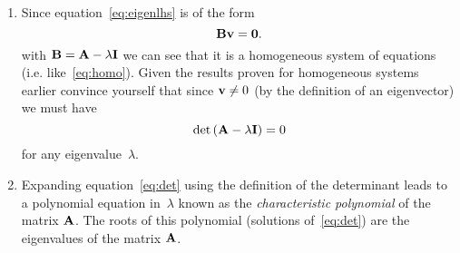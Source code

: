 {\begin{enumerate}
            Now equation~\eqref{eq:eigenlhs} looks like an improvement
            on~\eqref{eq:eigen} since the rhs is now known. However without
            knowing~$\lambda$ we now do not know the matrix~${\bf A} -
            \lambda{\bf I}$ on the lhs so we are not yet in a position to
            solve for ${\bf v}$.
        \item Since equation~\eqref{eq:eigenlhs} is of the form
            \[
                {\bf B} {\bf v} = {\bf 0}.
            \]
            with ${\bf B} = {\bf A} - \lambda{\bf I}$ we can see that it is a
            homogeneous system of equations (i.e. like~\eqref{eq:homo}).
            Given the results proven for homogeneous systems earlier convince
            yourself that since ${\bf v} \neq 0$ (by the definition of an
            eigenvector) we must have
            \begin{equation}
                \det \left({\bf A} - \lambda{\bf I}\right) = 0
                \label{eq:det}
            \end{equation}
            for any eigenvalue~$\lambda$.

        \item Expanding equation~\eqref{eq:det} using the definition of
            the determinant leads to a polynomial equation in~$\lambda$ known
            as the \emph{characteristic polynomial} of the matrix ${\bf A}$.
            The roots of this polynomial (solutions of~\eqref{eq:det}) are the
            eigenvalues of the matrix ${\bf A}$.


\end{enumerate}}
